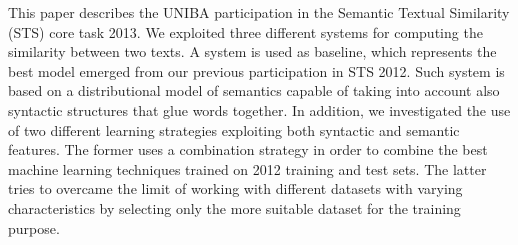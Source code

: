 This paper describes the UNIBA participation in the Semantic Textual Similarity (STS) core task 2013.
 We exploited three different systems for computing the similarity between two
 texts. A system is used as 
 baseline, which represents the best model emerged from our previous
 participation in STS 2012.
 Such system is based on a distributional model of semantics capable of taking
 into account also syntactic structures that glue words together.
 In addition, we investigated the use of two different learning strategies
 exploiting both syntactic and semantic features. The former uses a combination
 strategy in order to combine the best machine learning techniques trained on
 2012 training and test sets. The latter tries to overcame the limit of working
 with different datasets with varying characteristics by selecting only the more
 suitable dataset for the training purpose.

